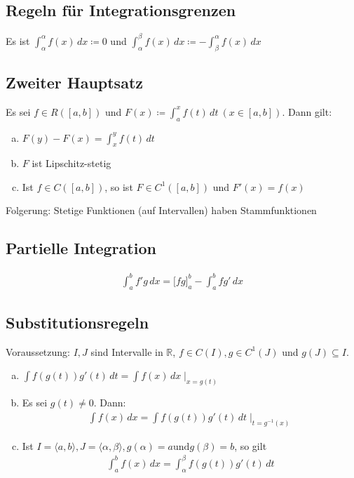 \subsection{Regeln für Integrationsgrenzen}
Es ist $\int_\alpha^\alpha f(x)\,dx \coloneqq 0$ und $\int_\alpha^\beta f(x)\,dx \coloneqq -\int_\beta^\alpha f(x)\,dx$

\subsection{Zweiter Hauptsatz}
Es sei $f \in R([a,b])$ und $F(x) \coloneqq \int_a^x f(t)\,dt\ (x \in [a,b])$. Dann gilt:
\begin{enumerate}[a)]
    \item $F(y) - F(x) = \int_x^y f(t)\,dt$
    \item $F$ ist Lipschitz-stetig
    \item Ist $f \in C([a,b])$, so ist $F \in C^1([a,b])$ und $F'(x) = f(x)$
\end{enumerate}
Folgerung: Stetige Funktionen (auf Intervallen) haben Stammfunktionen

\subsection{Partielle Integration}
\begin{align*}
    \int_a^b f'g\,dx = \Big[fg \Big]_{a}^b - \int_a^b fg'\,dx
\end{align*}

\subsection{Substitutionsregeln}
Voraussetzung: $I,J$ sind Intervalle in $\mathbb{R}$, $f \in C(I), g \in C^1(J)$ und $g(J) \subseteq I$.
\begin{enumerate}[a)]
    \item $\int f(g(t)) g'(t)\,dt = \int f(x)\,dx \mid_{x=g(t)}$
    \item Es sei $g(t) \neq 0$. Dann:
    \begin{align*}
        \int f(x)\,dx = \int f(g(t)) g'(t)\,dt \mid_{t=g^{-1}(x)}
    \end{align*}
    \item Ist $I = \langle a,b \rangle, J = \langle \alpha, \beta \rangle, g(\alpha) = a \text{und} g(\beta)=b$, so gilt
    \begin{align*}
        \int_a^b f(x)\,dx = \int_\alpha^\beta f(g(t))g'(t)\,dt
    \end{align*}
\end{enumerate}

